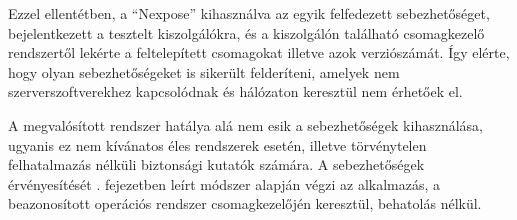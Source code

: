 	Ezzel ellentétben, a ``Nexpose'' kihasználva az egyik felfedezett sebezhetőséget, bejelentkezett a tesztelt kiszolgálókra, és a kiszolgálón található csomagkezelő rendszertől lekérte a feltelepített csomagokat illetve azok verziószámát. Így elérte, hogy olyan sebezhetőségeket is sikerült felderíteni, amelyek nem szerverszoftverekhez kapcsolódnak és hálózaton keresztül nem érhetőek el.
	
	A megvalósított rendszer hatálya alá nem esik a sebezhetőségek kihasználása, ugyanis ez nem kívánatos éles rendszerek esetén, illetve törvénytelen felhatalmazás nélküli biztonsági kutatók számára. A sebezhetőségek érvényesítését \az{\ref{vulnvalid}}. fejezetben leírt módszer alapján végzi az alkalmazás, a beazonosított operációs rendszer csomagkezelőjén keresztül, behatolás nélkül.
